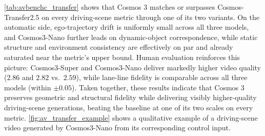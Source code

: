 \cref{tab:avbenchc_transfer} shows that Cosmos 3 matches or surpasses Cosmos-Transfer2.5 on every driving-scene metric through one of its two variants. On the automatic side, ego-trajectory drift is uniformly small across all three models, and Cosmos3-Nano further leads on dynamic-object correspondence, while static structure and environment consistency are effectively on par and already saturated near the metric's upper bound. Human evaluation reinforces this picture: Cosmos3-Super and Cosmos3-Nano deliver markedly higher video quality ($2.86$ and $2.82$ vs.\ $2.59$), while lane-line fidelity is comparable across all three models (within $\pm 0.05$). Taken together, these results indicate that Cosmos 3 preserves geometric and structural fidelity while delivering visibly higher-quality driving-scene generations, beating the baseline at one of its two scales on every metric. \cref{fig:av_transfer_example} shows a qualitative example of a driving-scene video generated by Cosmos3-Nano from its corresponding control input.

